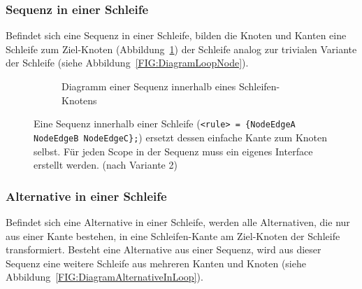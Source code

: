 \documentclass[../InterneDSLs.tex]{subfiles}
\begin{document}
\subsubsection{Sequenz in einer Schleife}
Befindet sich eine Sequenz in einer Schleife, bilden die Knoten und Kanten eine Schleife zum Ziel-Knoten (Abbildung~\ref{FIG:DiagramSequenceInLoop}) der Schleife analog zur trivialen Variante der Schleife (siehe Abbildung~\ref{FIG:DiagramLoopNode}).
\begin{figure}[ht]
\centering
  \begin{subfigure}[c]{0.49\textwidth}
    \caption{Diagramm einer Sequenz innerhalb eines Schleifen-Knotens}
    \label{FIG:DiagramSequenceInLoop}
  \end{subfigure}
  \begin{subfigure}[c]{0.49\textwidth}
    
  \end{subfigure}
  \caption{Eine Sequenz innerhalb einer Schleife (\texttt{<rule> = \{NodeEdgeA NodeEdgeB NodeEdgeC\};}) ersetzt dessen einfache Kante zum Knoten selbst. Für jeden Scope in der Sequenz muss ein eigenes Interface erstellt werden. (nach Variante 2)}
  \label{FIG:SequenceInLoop}
\end{figure}

\subsubsection{Alternative in einer Schleife}
Befindet sich eine Alternative in einer Schleife, werden alle Alternativen, die nur aus einer Kante bestehen, in eine Schleifen-Kante am Ziel-Knoten der Schleife transformiert. Besteht eine Alternative aus einer Sequenz, wird aus dieser Sequenz eine weitere Schleife aus mehreren Kanten und Knoten (siehe Abbildung~\ref{FIG:DiagramAlternativeInLoop}).
\end{document}
